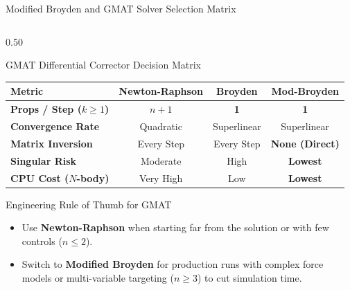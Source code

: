 \documentclass[aspectratio=169, 10pt]{beamer}
\begin{document}
\begin{frame}{Modified Broyden and GMAT Solver Selection Matrix}
\begin{columns}[t]
        \begin{column}{0.50\textwidth}
            \begin{block}{GMAT Differential Corrector Decision Matrix}
                \centering
                \scriptsize
                \setlength{\tabcolsep}{2.0pt}
                \begin{tabular}{lccc}
                    \toprule
                    \textbf{Metric} & \textbf{Newton-Raphson} & \textbf{Broyden} & \textbf{Mod-Broyden} \\ \midrule
                    \textbf{Props / Step ($k \ge 1$)} & $n + 1$ & \textbf{1} & \textbf{1} \\
                    \textbf{Convergence Rate} & Quadratic & Superlinear & Superlinear \\
                    \textbf{Matrix Inversion} & Every Step & Every Step & \textbf{None (Direct)} \\
                    \textbf{Singular Risk} & Moderate & High & \textbf{Lowest} \\
                    \textbf{CPU Cost ($N$-body)} & Very High & Low & \textbf{Lowest} \\ \bottomrule
                \end{tabular}
            \end{block}

            \vspace{-0.1cm}

            \begin{exampleblock}{Engineering Rule of Thumb for GMAT}
                \scriptsize
                \begin{itemize}\setlength{\itemsep}{1pt}
                    \item Use \textbf{Newton-Raphson} when starting far from the solution or with few controls ($n \le 2$).
                    \item Switch to \textbf{Modified Broyden} for production runs with complex force models or multi-variable targeting ($n \ge 3$) to cut simulation time.
                \end{itemize}
            \end{exampleblock}
        \end{column}
    \end{columns}
\end{frame}
\end{document}
